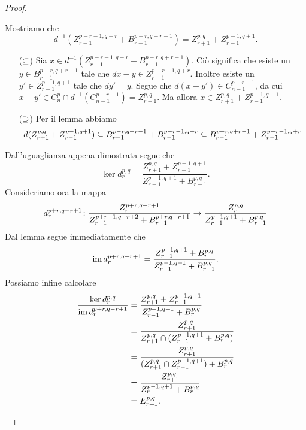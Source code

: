 \begin{proof}
\begin{enumerate}
$$$$
Mostriamo che 
$$
d^{-1}(Z^{p-r-1,q+r}_{r-1}+B^{p-r,q+r-1}_{r-1})=Z^{p,q}_{r+1}+Z^{p-1,q+1}_{r-1}.
$$
\begin{itemize}
\item[($\subseteq$)] Sia $x\in d^{-1}(Z^{p-r-1,q+r}_{r-1}+B^{p-r,q+r-1}_{r-1})$. Ciò significa che esiste un $y\in B^{p-r,q+r-1}_{r-1}$ tale che $dx-y\in Z^{p-r-1,q+r}_{r-1}$. Inoltre esiste un $y'\in Z^{p-1,q+1}_{r-1}$ tale che $dy'=y$. Segue che $d(x-y')\in C^{p-r-1}_{n-1}$, da cui $x-y'\in C^p_n\cap d^{-1}(C^{p-r-1}_{n-1})=Z^{p,q}_{r+1}$. Ma allora $x\in Z^{p,q}_{r+1}+Z^{p-1,q+1}_{r-1}$.
\item[($\supseteq$)] Per il lemma abbiamo
$$
d(Z^{p,q}_{r+1}+Z^{p-1,q+1}_{r-1})\subseteq B^{p-r,q+r-1}_{r-1}+B^{p-r-1,q+r}_{r-1}\subseteq B^{p-r,q+r-1}_{r-1}+Z^{p-r-1,q+r}_{r-1}
$$
\end{itemize}
Dall'uguaglianza appena dimostrata segue che
$$
\ker d^{p,q}_r=\frac{Z^{p,q}_{r+1}+Z^{p-1,q+1}_{r-1}}{Z^{p-1,q+1}_{r-1}+B^{p,q}_{r-1}}.
$$
Consideriamo ora la mappa
$$
d^{p+r,q-r+1}_r\colon\frac{Z^{p+r,q-r+1}_r}{Z^{p+r-1,q-r+2}_{r-1}+B^{p+r,q-r+1}_{r-1}}\to\frac{Z^{p,q}_r}{Z^{p-1,q+1}_{r-1}+B^{p,q}_{r-1}}
$$
Dal lemma segue immediatamente che
$$
\operatorname{im} d^{p+r,q-r+1}_r=\frac{Z^{p-1,q+1}_{r-1}+B^{p,q}_r}{Z^{p-1,q+1}_{r-1}+B^{p,q}_{r-1}}.
$$
Possiamo infine calcolare
\begin{align*}
\frac{\ker d^{p,q}_r}{\operatorname{im} d^{p+r,q-r+1}_r}&=\frac{Z^{p,q}_{r+1}+Z^{p-1,q+1}_{r-1}}{Z^{p-1,q+1}_{r-1}+B^{p,q}_r}\\
&=\frac{Z^{p,q}_{r+1}}{Z^{p,q}_{r+1}\cap(Z^{p-1,q+1}_{r-1}+B^{p,q}_r)}\\
&=\frac{Z^{p,q}_{r+1}}{(Z^{p,q}_{r+1}\cap Z^{p-1,q+1}_{r-1})+B^{p,q}_r}\\
&=\frac{Z^{p,q}_{r+1}}{Z^{p-1,q+1}_r+B^{p,q}_r}\\
&=E^{p,q}_{r+1}.
\end{align*}
\end{enumerate}
\end{proof}
